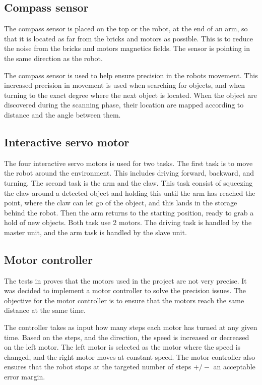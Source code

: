 \subsection{Compass sensor}
The compass sensor is placed on the top or the robot, at the end of an arm, so that it is located as far from the bricks and motors as possible. This is to reduce the noise from the bricks and motors magnetics fields. The sensor is pointing in the same direction as the robot.

The compass sensor is used to help ensure precision in the robots movement. This increased precision in movement is used when searching for objects, and when turning to the exact degree where the next object is located. When the object are discovered during the scanning phase, their location are mapped according to distance and the angle between them.

\subsection{Interactive servo motor}
The four interactive servo motors is used for two tasks. The first task is to move the robot around the environment. This includes driving forward, backward, and turning. The second task is the arm and the claw. This task consist of squeezing the claw around a detected object and holding this until the arm has reached the point, where the claw can let go of the object, and this lands in the storage behind the robot. Then the arm returns to the starting position, ready to grab a hold of new objects. Both task use 2 motors. The driving task is handled by the master unit, and the arm task is handled by the slave unit.

\subsection{Motor controller}
The tests in  proves that the motors used in the project are not very precise. It was decided to implement a motor controller to solve the precision issues. The objective for the motor controller is to ensure that the motors reach the same distance at the same time. 

The controller takes as input how many steps each motor has turned at any given time. Based on the steps, and the direction, the speed is increased or decreased on the left motor. The left motor is selected as the motor where the speed is changed, and the right motor moves at constant speed. The motor controller also ensures that the robot stops at the targeted number of steps $+/-$ an acceptable error margin.

